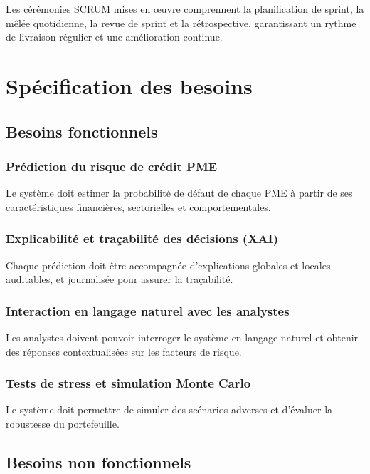 \documentclass[a4paper,12pt,oneside]{report}
\begin{document}
Les cérémonies SCRUM mises en œuvre comprennent la planification de sprint, la mêlée
quotidienne, la revue de sprint et la rétrospective, garantissant un rythme de livraison
régulier et une amélioration continue.

\section{Spécification des besoins}

\subsection{Besoins fonctionnels}

\subsubsection{Prédiction du risque de crédit PME}

Le système doit estimer la probabilité de défaut de chaque PME à partir de ses
caractéristiques financières, sectorielles et comportementales.

\subsubsection{Explicabilité et traçabilité des décisions (XAI)}

Chaque prédiction doit être accompagnée d'explications globales et locales auditables, et
journalisée pour assurer la traçabilité.

\subsubsection{Interaction en langage naturel avec les analystes}

Les analystes doivent pouvoir interroger le système en langage naturel et obtenir des
réponses contextualisées sur les facteurs de risque.

\subsubsection{Tests de stress et simulation Monte Carlo}

Le système doit permettre de simuler des scénarios adverses et d'évaluer la robustesse du
portefeuille.

\subsection{Besoins non fonctionnels}
\end{document}
